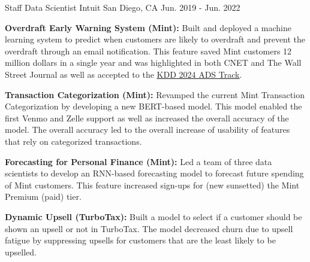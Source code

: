 \begin{cventries}
\cventry
    {Staff Data Scientist} %
    {Intuit} %
    {San Diego, CA} %
    {Jun. 2019 - Jun. 2022} %
    {\begin{cvitems}
        \setlength\itemsep{.15em}
        \item { \textbf{Overdraft Early Warning System (Mint): }Built and deployed a machine learning system to predict when customers are likely to overdraft and prevent the overdraft through an email notification. This feature saved Mint customers 12 million dollars in a single year and was highlighted in both CNET and The Wall Street Journal as well as accepted to the \href{https://dl.acm.org/doi/10.1145/3637528.3671628}{\underline{KDD 2024 ADS Track}}. }
        \item { \textbf{Transaction Categorization (Mint): }  Revamped the current Mint Transaction Categorization by developing a new BERT-based model. This model enabled the first Venmo and Zelle support as well as increased the overall accuracy of the model. The overall accuracy led to the overall increase of usability of features that rely on categorized transactions. }
         \item { \textbf{Forecasting for Personal Finance (Mint): } Led a team of three data scientists to develop an RNN-based forecasting model to forecast future spending of Mint customers. This feature increased sign-ups for (new sunsetted) the Mint Premium (paid) tier.}
         \item { \textbf{Dynamic Upsell (TurboTax):} Built a model to select if a customer should be shown an upsell or not in TurboTax. The model decreased churn due to upsell fatigue by suppressing upsells for customers that are the least likely to be upselled. }
     \end{cvitems}}



\end{cventries}
